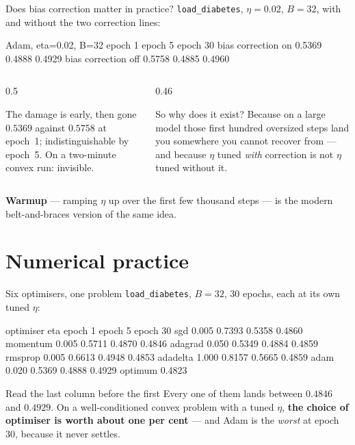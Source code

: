 \documentclass[aspectratio=169]{beamer}
\begin{document}
\begin{frame}[fragile]{Does bias correction matter in practice?}
\texttt{load\_diabetes}, $\eta = 0.02$, $B = 32$, with and without the two
correction lines:
\begin{outblk}
Adam, eta=0.02, B=32          epoch 1   epoch 5   epoch 30
bias correction on              0.5369    0.4888     0.4929
bias correction off             0.5758    0.4885     0.4960
\end{outblk}
\begin{columns}[T]
  \begin{column}{0.5\textwidth}
    \begin{block}{The damage is early, then gone}
      \small $0.5369$ against $0.5758$ at epoch~1; indistinguishable by
      epoch~5. On a two-minute convex run: invisible.
    \end{block}
  \end{column}
  \begin{column}{0.46\textwidth}
    \begin{alertblock}{So why does it exist?}
      \small Because on a large model those first hundred oversized steps land
      you somewhere you cannot recover from --- and because $\eta$ tuned
      \emph{with} correction is not $\eta$ tuned without it.
    \end{alertblock}
  \end{column}
\end{columns}
\begin{center}\small
  \textbf{Warmup} --- ramping $\eta$ up over the first few thousand steps --- is
  the modern belt-and-braces version of the same idea.
\end{center}
\end{frame}

\section[Practice]{Numerical practice}
\label{sec:practice}

\begin{frame}[fragile]{Six optimisers, one problem}
\texttt{load\_diabetes}, $B=32$, 30 epochs, each at its own tuned $\eta$:
\begin{outblk}
optimiser     eta    epoch 1  epoch 5 epoch 30
sgd         0.005     0.7393   0.5358   0.4860
momentum    0.005     0.5711   0.4870   0.4846
adagrad     0.050     0.5349   0.4884   0.4859
rmsprop     0.005     0.6613   0.4948   0.4853
adadelta    1.000     0.8157   0.5665   0.4859
adam        0.020     0.5369   0.4888   0.4929
optimum                                 0.4823
\end{outblk}
\begin{alertblock}{Read the last column before the first}
  \footnotesize Every one of them lands between $0.4846$ and $0.4929$. On a
  well-conditioned convex problem with a tuned $\eta$, \textbf{the choice of
  optimiser is worth about one per cent} --- and Adam is the \emph{worst} at
  epoch 30, because it never settles.
\end{alertblock}
\end{frame}
\end{document}
